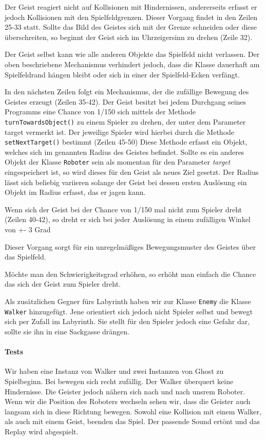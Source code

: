 \documentclass{pi1}
\begin{document}
Der Geist reagiert nicht auf Kollisionen mit Hindernissen, andererseits erfasst er jedoch Kollisionen mit den Spielfeldgrenzen. Dieser Vorgang findet in den Zeilen 25-33 statt. Sollte das Bild des Geistes sich mit der Grenze schneiden oder diese überschreiten, so beginnt der Geist sich im Uhrzeigersinn zu drehen (Zeile 32).

Der Geist selbst kann wie alle anderen Objekte das Spielfeld nicht verlassen. Der oben beschriebene Mechanismus verhindert jedoch, dass die Klasse dauerhaft am Spielfeldrand hängen bleibt oder sich in einer der Spielfeld-Ecken verfängt. 

In den nächsten Zeilen folgt ein Mechanismus, der die zufällige Bewegung des Geistes erzeugt (Zeilen 35-42).
Der Geist besitzt bei jedem Durchgang seines Programms eine Chance von 1/150 sich mittels der Methode  \texttt{turnTowardsObject()} zu einem Spieler zu drehen, der unter dem Parameter target vermerkt ist.\newline
Der jeweilige Spieler wird hierbei durch die Methode  \texttt{setNextTarget()} bestimmt (Zeilen 45-50)\newline
Diese Methode erfasst ein Objekt, welches sich im genannten Radius des Geistes befindet. Sollte es ein anderes Objekt der Klasse  \texttt{Roboter} sein als momentan für den Parameter  \emph{target} eingespeichert ist, so wird dieses für den Geist als neues Ziel gesetzt.\newline
Der Radius lässt sich beliebig variieren solange der Geist bei dessen ersten Auslösung ein Objekt im Radius erfasst, das er jagen kann.

Wenn sich der Geist bei der Chance von 1/150 mal nicht zum Spieler dreht (Zeilen 40-42), so dreht er sich bei jeder Auslösung in einem zufälligen Winkel von +- 3 Grad

Dieser Vorgang sorgt für ein unregelmäßiges Bewegungsmuster des Geistes über das Spielfeld.

Möchte man den Schwierigkeitsgrad erhöhen, so erhöht man einfach die Chance das sich der Geist zum Spieler dreht.

Als zusätzlichen Gegner fürs Labyrinth haben wir zur Klasse  \texttt{Enemy} die Klasse  \texttt{Walker} hinzugefügt. Jene orientiert sich jedoch nicht Spieler selbst und bewegt sich per Zufall im Labyrinth.
Sie stellt für den Spieler jedoch eine Gefahr dar, sollte sie ihn in eine Sackgasse drängen.

\paragraph{Tests} Wir haben eine Instanz von Walker und zwei Instanzen von Ghost zu Spielbeginn. Bei bewegen sich recht zufällig. Der Walker überquert keine Hindernisse. Die Geister jedoch nähern sich nach und nach unsrem Roboter. Wenn wir die Position des Roboters wechseln sehen wir, dass die Geister auch langsam sich in diese Richtung bewegen. Sowohl eine Kollision mit einem Walker, als auch mit einem Geist, beenden das Spiel. Der passende Sound ertönt und das Replay wird abgespielt.
\end{document}
